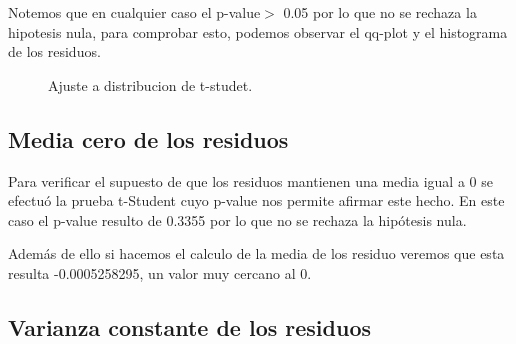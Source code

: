  Notemos que en cualquier caso el p-value$>$ 0.05 por lo que no se rechaza la hipotesis nula, para comprobar esto, podemos observar el qq-plot y el histograma de los residuos.
 
 \begin{figure}[h]
    \centering
    \vspace{10mm}
    \caption{Ajuste a distribucion de t-studet.} 
    \label{Ajuste a distribucion de t-studet.}
\end{figure}
 
 
 
\subsection{Media cero de los residuos}
\bigskip
 Para verificar el supuesto de que los residuos mantienen una media igual a 0 se efectuó la prueba t-Student cuyo p-value nos permite afirmar este hecho. En este caso el p-value resulto de 0.3355 por lo que no se rechaza la hipótesis nula.
 

 Además de ello si hacemos el calculo de la media de los residuo veremos que esta resulta -0.0005258295, un valor muy cercano al 0.
 \newpage
\subsection{Varianza constante de los residuos}

